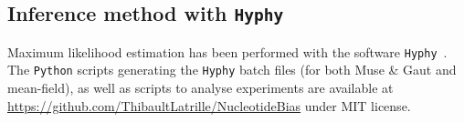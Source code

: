 \subsection{Inference method with \texttt{Hyphy}}

Maximum likelihood estimation has been performed with the software \texttt{Hyphy}~\citep{Pond2005}.
The \texttt{Python} scripts generating the \texttt{Hyphy} batch files (for both Muse \& Gaut and mean-field), as well as scripts to analyse experiments are available at \url{https://github.com/ThibaultLatrille/NucleotideBias} under MIT license.
